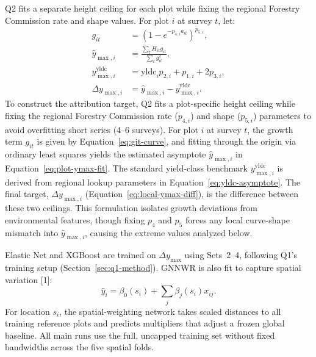 \documentclass[logo,msc,ai]{infthesis}           %
\begin{document}
Q2 fits a separate height ceiling for each plot while fixing the regional Forestry Commission rate and shape values. For plot $i$ at survey $t$, let:
\begin{align}
g_{it} &= \left(1-e^{-p_{4,i}a_{it}}\right)^{p_{5,i}}, \label{eq:git-curve} \\
\hat y_{\max,i} &= \frac{\sum_t H_{it}g_{it}}{\sum_t g_{it}^2}, \label{eq:plot-ymax-fit} \\
y_{\max,i}^{\mathrm{yldc}} &= \mathrm{yldc}_i p_{2,i}+p_{1,i}+2p_{3,i}, \label{eq:yldc-asymptote} \\
\Delta y_{\max,i} &= \hat y_{\max,i}-y_{\max,i}^{\mathrm{yldc}}. \label{eq:local-ymax-diff}
\end{align}
To construct the attribution target, Q2 fits a plot-specific height ceiling while fixing the regional Forestry Commission rate ($p_{4,i}$) and shape ($p_{5,i}$) parameters to avoid overfitting short series (4--6 surveys). For plot $i$ at survey $t$, the growth term $g_{it}$ is given by Equation~\eqref{eq:git-curve}, and fitting through the origin via ordinary least squares yields the estimated asymptote $\hat y_{\max,i}$ in Equation~\eqref{eq:plot-ymax-fit}. The standard yield-class benchmark $y_{\max,i}^{\mathrm{yldc}}$ is derived from regional lookup parameters in Equation~\eqref{eq:yldc-asymptote}. The final target, $\Delta y_{\max,i}$ (Equation~\eqref{eq:local-ymax-diff}), is the difference between these two ceilings. This formulation isolates growth deviations from environmental features, though fixing $p_4$ and $p_5$ forces any local curve-shape mismatch into $\hat y_{\max,i}$, causing the extreme values analyzed below.

Elastic Net and XGBoost are trained on $\Delta y_{\max}$ using Sets~2--4, following Q1's training setup (Section~\ref{sec:q1-method}). GNNWR is also fit to capture spatial variation [1]:
\begin{equation}
\hat y_i=\beta_0(s_i)+\sum_j\beta_j(s_i)x_{ij}.
\label{eq:gnnwr}
\end{equation}
For location $s_i$, the spatial-weighting network takes scaled distances to all training reference plots and predicts multipliers that adjust a frozen global baseline. All main runs use the full, uncapped training set without fixed bandwidths across the five spatial folds.
\end{document}
